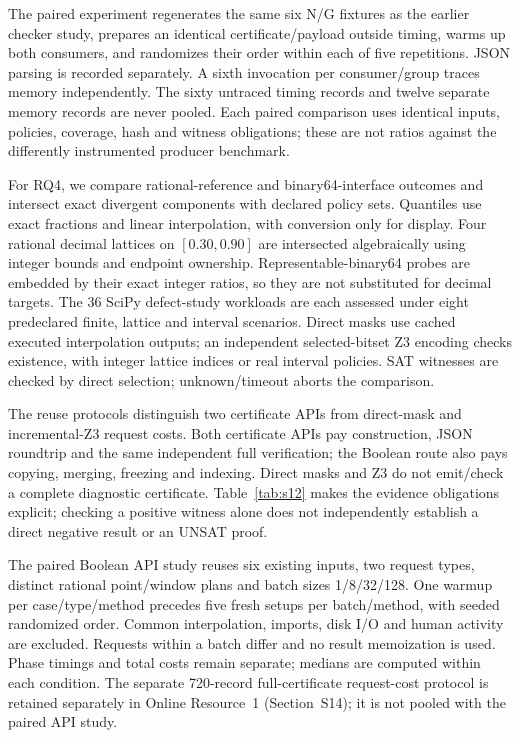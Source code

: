 \documentclass[11pt,a4paper]{article}
\theoremstyle{plain}
\theoremstyle{definition}
\theoremstyle{remark}
\begin{document}
The paired experiment regenerates the same six N/G fixtures as the earlier checker study, prepares an identical certificate/payload outside timing, warms up both consumers, and randomizes their order within each of five repetitions. JSON parsing is recorded separately. A sixth invocation per consumer/group traces memory independently. The sixty untraced timing records and twelve separate memory records are never pooled. Each paired comparison uses identical inputs, policies, coverage, hash and witness obligations; these are not ratios against the differently instrumented producer benchmark.

For RQ4, we compare rational-reference and binary64-interface outcomes and intersect exact divergent components with declared policy sets. Quantiles use exact fractions and linear interpolation, with conversion only for display. Four rational decimal lattices on $[0.30, 0.90]$ are intersected algebraically using integer bounds and endpoint ownership. Representable-binary64 probes are embedded by their exact integer ratios, so they are not substituted for decimal targets. The 36 SciPy defect-study workloads are each assessed under eight predeclared finite, lattice and interval scenarios. Direct masks use cached executed interpolation outputs; an independent selected-bitset Z3 encoding \cite{demoura2008z3} checks existence, with integer lattice indices or real interval policies. SAT witnesses are checked by direct selection; unknown/timeout aborts the comparison.

The reuse protocols distinguish two certificate APIs from direct-mask and incremental-Z3 request costs. Both certificate APIs pay construction, JSON roundtrip and the same independent full verification; the Boolean route also pays copying, merging, freezing and indexing. Direct masks and Z3 do not emit/check a complete diagnostic certificate. Table~\ref{tab:s12} makes the evidence obligations explicit; checking a positive witness alone does not independently establish a direct negative result or an UNSAT proof.

The paired Boolean API study reuses six existing inputs, two request types, distinct rational point/window plans and batch sizes 1/8/32/128. One warmup per case/type/method precedes five fresh setups per batch/method, with seeded randomized order. Common interpolation, imports, disk I/O and human activity are excluded. Requests within a batch differ and no result memoization is used. Phase timings and total costs remain separate; medians are computed within each condition. The separate 720-record full-certificate request-cost protocol is retained separately in Online Resource~1 (Section~S14); it is not pooled with the paired API study.
\end{document}
